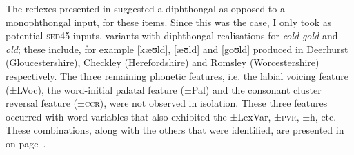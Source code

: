 {{{The  reflexes presented in  suggested a diphthongal as opposed to a monophthongal  input, for these items. Since this was the case, I only took as potential  \textsc{sed45} inputs, variants with diphthongal realisations for \emph{cold} \emph{gold} and \emph{old}; these include, for example [kæʊld], [æʊld] and [goʊld] produced in Deerhurst (Gloucestershire), Checkley (Herefordshire) and Romsley (Worcestershire) respectively. The three remaining phonetic features, i.e. the labial voicing feature (±LVoc), the word-initial palatal feature (±Pal) and the consonant cluster reversal feature (±\textsc{ccr}), were not observed in isolation. These three features occurred with word variables that also exhibited the ±LexVar, ±\textsc{pvr}, ±h, etc. These combinations, along with the others that were identified, are presented in  on page~\pageref{Table 3.8}.


}}}
